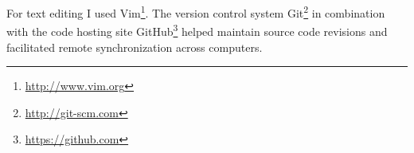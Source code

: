 For text editing I used Vim\footnote{\url{http://www.vim.org}}. The version control system
Git\footnote{\url{http://git-scm.com}} in combination with the code hosting site
GitHub\footnote{\url{https://github.com}} helped maintain source code revisions
and facilitated remote synchronization across computers.
